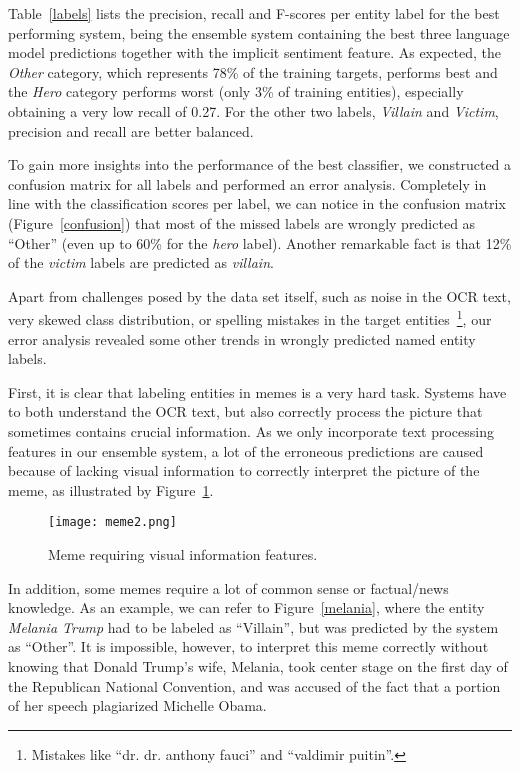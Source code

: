 \documentclass[11pt]{article}
\begin{document}
Table~\ref{labels} lists the precision, recall and F-scores per entity label for the best performing system, being the ensemble system containing the best three language model predictions together with the implicit sentiment feature. As expected, the \emph{Other} category, which represents 78\% of the training targets, performs best and the \emph{Hero} category performs worst (only 3\% of training entities), especially obtaining a very low recall of 0.27. For the other two labels, \emph{Villain} and \emph{Victim}, precision and recall are better balanced. 


To gain more insights into the performance of the best classifier, we constructed a confusion matrix for all labels and performed an error analysis.
Completely in line with the classification scores per label, we can notice in the confusion matrix (Figure~\ref{confusion}) that most of the missed labels are wrongly predicted as ``Other'' (even up to 60\% for the \emph{hero} label). Another remarkable fact is that 12\% of the \emph{victim} labels are predicted as \emph{villain}. 

Apart from challenges posed by the data set itself, such as noise in the OCR text, very skewed class distribution, or spelling mistakes in the target entities~\footnote{Mistakes like ``dr. dr. anthony fauci'' and ``valdimir puitin''.}, our error analysis revealed some other trends in wrongly predicted named entity labels.

First, it is clear that labeling entities in memes is a very hard task. Systems have to both understand the OCR text, but also correctly process the picture that sometimes contains crucial information.
As we only incorporate text processing features in our ensemble system, a lot of the erroneous predictions are caused because of lacking visual information to correctly interpret the picture of the meme, as illustrated by Figure~\ref{meme2}. 

\begin{figure}[h!]
    \texttt{[image: meme2.png]}
    \caption{Meme requiring visual information features.}
    \label{meme2}
\end{figure}

In addition, some memes require a lot of common sense or factual/news knowledge. As an example, we can refer to Figure~\ref{melania}, where the entity \emph{Melania Trump} had to be labeled as ``Villain'', but was predicted by the system as ``Other''. It is impossible, however, to interpret this meme correctly without knowing that Donald Trump's wife, Melania, took center stage on the first day of the Republican National Convention, and was accused of the fact that a portion of her speech plagiarized Michelle Obama.
\end{document}
